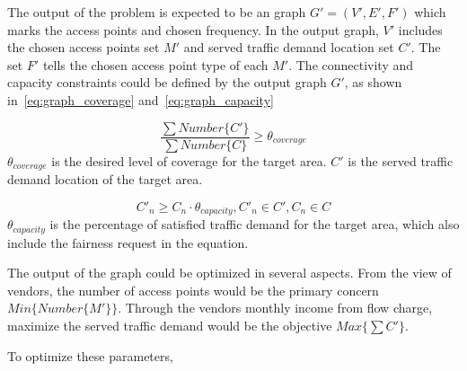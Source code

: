 The output of the problem is expected to be an graph $G' = (V',E',F')$ which marks the access points
and chosen frequency. 
In the output graph, $V'$ includes the chosen access points set $M'$ and served traffic demand location
set $C'$. The set $F'$ tells the chosen access point type of each $M'$.
The connectivity and capacity constraints could be defined by the output graph $G'$, as shown 
in~\ref{eq:graph_coverage} and~\ref{eq:graph_capacity} 

\begin{equation}
\label{eq:graph_coverage}
\frac{\sum{Number\{C'\}}}{\sum{Number\{C\}}} \ge \theta_{coverage} 
\end{equation}
$\theta_{coverage}$ is the desired level of coverage for the target area. $C'$ is the 
served traffic demand location of the target area. 
 
\begin{equation}
\label{eq:graph_capacity}
C'_n \ge C_n\cdot \theta_{capacity}, C'_n \in C', C_n \in C
\end{equation}
$\theta_{capacity}$ is the percentage of satisfied traffic demand for the target area,
which also include the fairness request in the equation.

The output of the graph could be optimized in several aspects. From the view of vendors,
the number of access points would be the primary concern $Min{\{Number\{M'\}\}}$.
Through the vendors monthly income from flow charge, maximize the served traffic
demand would be the objective $Max{\{\sum{C'}\}}$. 

To optimize these parameters, 



